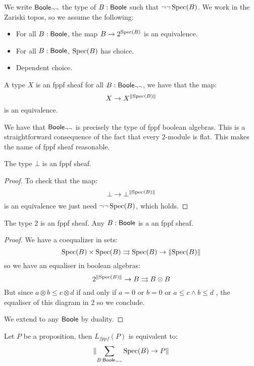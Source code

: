 We write $\mathsf{Boole}_{\neg\neg}$ the type of $B:\mathsf{Boole}$ such that $\neg\neg\operatorname{Spec}(B)$. We work in the Zariski topos, so we assume the following:

\begin{itemize}
\item For all $B:\mathsf{Boole}$, the map $B\to {2}^{\operatorname{Spec}(B)}$ is an equivalence.
\item For all $B:\mathsf{Boole}$, $\operatorname{Spec}(B)$ has choice.
\item Dependent choice.
\end{itemize}

\begin{definition}
A type $X$ is an fppf sheaf for all $B:\mathsf{Boole}_{\neg\neg}$, we have that the map:
\[X\to X^{\lVert \operatorname{Spec}(B) \rVert}\]
is an equivalence.
\end{definition}

\begin{remark}
We have that $\mathsf{Boole}_{\neg\neg}$ is precisely the type of fppf boolean algebras. This is a straightforward consequence of the fact that every ${2}$-module is flat. This makes the name of fppf sheaf reasonable.
\end{remark}

\begin{lemma}\label{bot-sheaf}
The type $\bot$ is an fppf sheaf.
\end{lemma}

\begin{proof}
To check that the map:
\[\bot\to \bot^{\lVert \operatorname{Spec}(B) \rVert}\]
is an equivalence we just need $\neg\neg\operatorname{Spec}(B)$, which holds.
\end{proof}

\begin{lemma}\label{fppf-subcanonical}
The type ${2}$ is an fppf sheaf. Any $B:\mathsf{Boole}$ is a an fppf sheaf.
\end{lemma}

\begin{proof}
We have a coequalizer in sets:
\[\operatorname{Spec}(B)\times\operatorname{Spec}(B) \rightrightarrows \operatorname{Spec}(B)\to \lVert \operatorname{Spec}(B) \rVert \]
so we have an equaliser in boolean algebras:
\[ {2}^{\lVert \operatorname{Spec}(B) \rVert}\to B\rightrightarrows B\otimes B \]
But since $a\otimes b\leq c\otimes d$ if and only if $a=0$ or $b=0$ or $a\leq c\land b\leq d$ , the equaliser of this diagram in ${2}$ so we conclude.

We extend to any $\mathsf{Boole}$ by duality.
\end{proof}

\begin{lemma}\label{proposition-fppf-sheaf}
Let $P$ be a proposition, then $L_{fppf}(P)$ is equivalent to:
\[\lVert \sum_{B:\mathsf{Boole}_{\neg\neg}} \operatorname{Spec}(B)\to P \rVert\]
\end{lemma}

